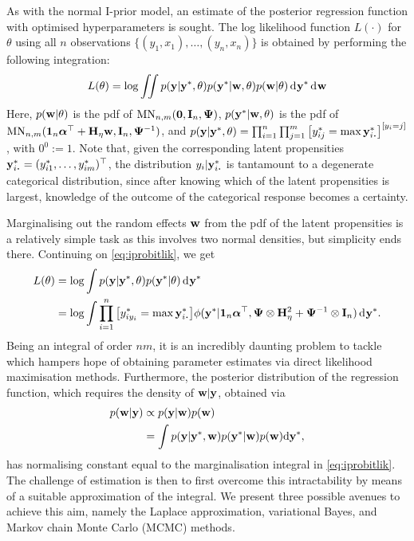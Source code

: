 
As with the normal I-prior model, an estimate of the posterior regression function with optimised hyperparameters is sought.
The log likelihood function $L(\cdot)$ for $\theta$ using all $n$ observations $\{(y_1,x_1),\dots,(y_n,x_n)\}$ is obtained by performing the following integration:
\begin{equation}\label{eq:iprobitlik}
  L(\theta) 
  = \log \iint p({\mathbf y}|{\mathbf y}^*,\theta) p({\mathbf y}^*|{\mathbf w},\theta) p({\mathbf w}|\theta) \operatorname{d}\hspace{0.5pt}\! {\mathbf y}^* \operatorname{d}\hspace{0.5pt}\! {\mathbf w}  
\end{equation}
Here, $p({\mathbf w}|\theta)$ is the pdf of $\operatorname{MN}_{n,m}({\mathbf 0},{\mathbf I}_n,{\bm\Psi})$, $p({\mathbf y}^*|{\mathbf w},\theta)$ is the pdf of $\operatorname{MN}_{n,m}({\mathbf 1}_n{\bm\alpha}^\top + {\mathbf H}_\eta{\mathbf w},{\mathbf I}_n,{\bm\Psi}^{-1})$, and $p(\by|\by^*,\theta) = \prod_{i=1}^n \prod_{j=1}^m \big[y_{ij}^* 
    = \max \by^*_{i\bigcdot}\big]^{[y_i = j]}$, with $0^0 := 1$.
Note that, given the corresponding latent propensities $\by^*_{i\bigcdot} = (y_{i1}^*,\dots,y_{im}^*)^\top$, the distribution $y_i|\by^*_{i\bigcdot}$ is tantamount to a degenerate categorical distribution, since after knowing which of the latent propensities is largest, knowledge of the outcome of the categorical response becomes a certainty.

Marginalising out the random effects ${\mathbf w}$ from the pdf of the latent propensities is a relatively simple task as this involves two normal densities, but simplicity ends there.
Continuing on \cref{eq:iprobitlik}, we get
\begin{align*}
  L(\theta) 
  &= \log \int p(\by|\by^*,\theta) p(\by^*|\theta) \dint \by^* \\
  &= \log \int \prod_{i=1}^n \big[y_{iy_i}^* 
  = \max \by^*_{i\bigcdot}\big]
  \phi(\by^*|\bone_n\balpha^\top, \bPsi \otimes \bH_\eta^2 + \bPsi^{-1} \otimes \bI_n) \dint \by^*.
\end{align*}
Being an integral of order $nm$, it is an incredibly daunting problem to tackle which hampers hope of obtaining parameter estimates via direct likelihood maximisation methods.
Furthermore, the posterior distribution of the regression function, which requires the density of ${\mathbf w}|{\mathbf y}$, obtained via
\begin{align*}
  p({\mathbf w}|{\mathbf y}) 
  &\propto p({\mathbf y}|{\mathbf w})p({\mathbf w}) \\
  &= \int p({\mathbf y}|{\mathbf y}^*,{\mathbf w})p({\mathbf y}^*|{\mathbf w})p({\mathbf w})\text{d}{\mathbf y}^*,
\end{align*}
has normalising constant equal to the marginalisation integral in  \cref{eq:iprobitlik}.
The challenge of estimation is then to first overcome this intractability by means of a suitable approximation of the integral.
We present three possible avenues to achieve this aim, namely the Laplace approximation, variational Bayes, and Markov chain Monte Carlo (MCMC) methods.

